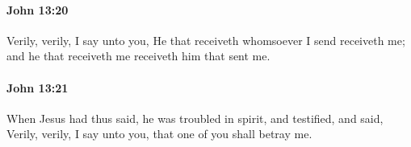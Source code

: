 		\paragraph{John 13:20} %
			\label{JOHN-13-20}

			Verily, verily, I say unto you, He that receiveth whomsoever I send receiveth me; and he that receiveth me receiveth him that sent me.

			\begin{framed}
				\scriptsize
				\begin{compactdesc}
					\item[SBLG] 
				\end{compactdesc}
			\end{framed}

		\paragraph{John 13:21} %
			\label{JOHN-13-21}

			When Jesus had thus said, he was troubled in spirit, and testified, and said, Verily, verily, I say unto you, that one of you shall betray me.


